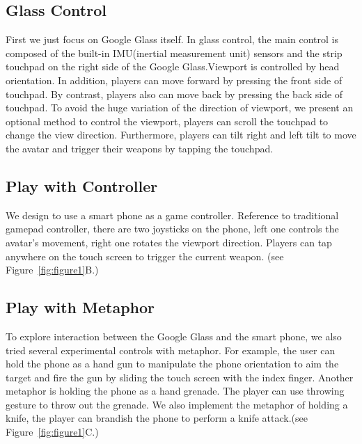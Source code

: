 \documentclass{sigchi}
\begin{document}
\subsection{Glass Control}
First we just focus on Google Glass itself. In glass control, the main control is composed of the built-in IMU(inertial measurement unit) sensors and the strip touchpad on the right side of the Google Glass.Viewport is controlled by head orientation. In addition, players can move forward by pressing the front side of touchpad. By contrast, players also can move back by pressing the back side of touchpad.
To avoid the huge variation of the direction of viewport, we present an optional method to control the viewport, players can scroll the touchpad to change the view direction. Furthermore, players can tilt right and left tilt to move the avatar and trigger their weapons by tapping the touchpad.%

\subsection{Play with Controller}
We design to use a smart phone as a game controller. Reference to traditional gamepad controller, there are two joysticks on the phone, left one controls the avatar's movement, right one rotates the viewport direction. Players can tap anywhere on the touch screen to trigger the current weapon. %
(see Figure~\ref{fig:figure1}B.)

\subsection{Play with Metaphor}
To explore interaction between the Google Glass and the smart phone, we also tried several experimental controls with metaphor. For example, the user can hold the phone as a hand gun to manipulate the phone orientation to aim the target and fire the gun by sliding the touch screen with the index finger. Another metaphor is holding the phone as a hand grenade. The player can use throwing gesture to throw out the grenade. We also implement the metaphor of holding a knife, the player can brandish the phone to perform a knife attack.(see Figure~\ref{fig:figure1}C.)
\end{document}
